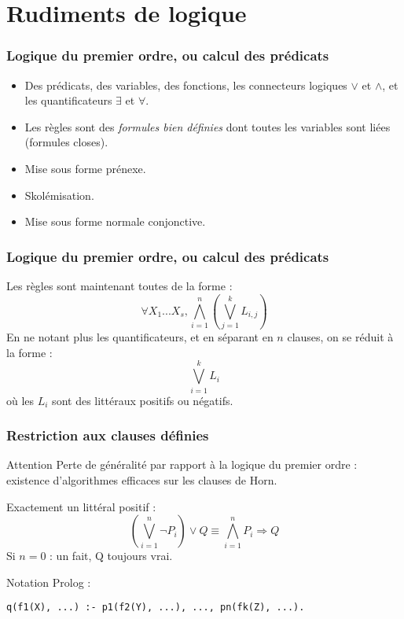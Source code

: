 \documentclass[aspectratio=43]{beamer}
\begin{document}
\section{Rudiments de logique}

\begin{frame}
  \frametitle{Logique du premier ordre, ou calcul des prédicats}

  \begin{itemize}
  \item Des prédicats, des variables, des fonctions, les connecteurs logiques $\vee$ et $\wedge$, et les quantificateurs $\exists$ et $\forall$.
    
  \item Les règles sont des \textit{formules bien définies} dont toutes les variables sont liées (formules closes).

  \item Mise sous forme prénexe.
    
  \item Skolémisation.

  \item Mise sous forme normale conjonctive.
  \end{itemize}
\end{frame}

\begin{frame}
  \frametitle{Logique du premier ordre, ou calcul des prédicats}
  Les règles sont maintenant toutes de la forme :
  $$\forall X_{1}...X_{s},\bigwedge_{i=1}^{n}\left(\bigvee_{j=1}^{k}L_{i,j}\right)$$
  En ne notant plus les quantificateurs, et en séparant en $n$ clauses, on se réduit à la forme :
  $$\bigvee_{i=1}^{k}L_{i}$$ où les $L_{i}$ sont des littéraux positifs ou négatifs.
\end{frame}

\begin{frame}[fragile]
  \frametitle{Restriction aux clauses définies}
  \begin{alertblock}{Attention}
    Perte de généralité par rapport à la logique du premier ordre : existence d'algorithmes efficaces sur les clauses de Horn.
  \end{alertblock}
  
  Exactement un littéral positif :
  $$\left(\bigvee_{i=1}^{n}\neg P_{i}\right)\vee{Q} \equiv \bigwedge_{i=1}^{n}P_{i}\Rightarrow Q$$
  Si $n=0$ : un fait, Q toujours vrai.

  \vspace{1em}
  
  Notation Prolog :
  \begin{verbatim}  
q(f1(X), ...) :- p1(f2(Y), ...), ..., pn(fk(Z), ...).
  \end{verbatim}
\end{frame}
\end{document}
